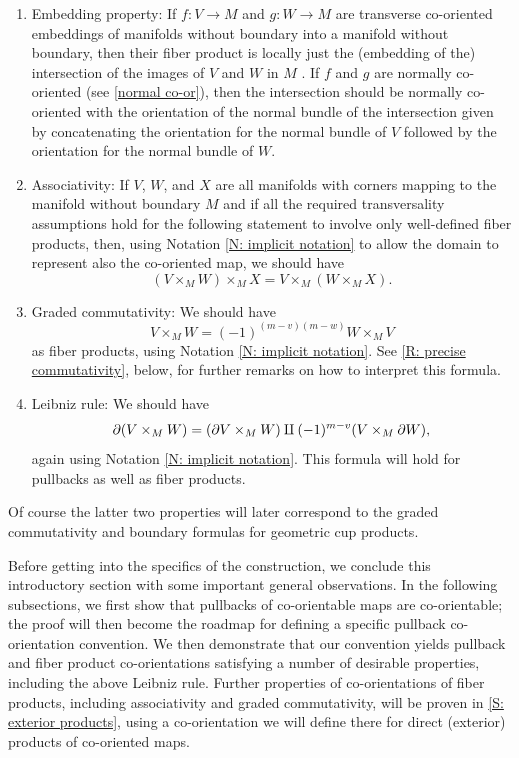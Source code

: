 \begin{enumerate}
	\item Embedding property: If $f \colon V \to M$ and $g \colon W \to M$ are transverse co-oriented embeddings of manifolds without boundary into a manifold without boundary, then their fiber product is locally just the (embedding of the) intersection of the images of $V$ and $W$ in $M$ \cite[Proposition 7.3.5]{MaDo92}.
	If $f$ and $g$ are normally co-oriented (see \cref{normal co-or}), then the intersection should be normally co-oriented with the orientation of the normal bundle of the intersection given by concatenating the orientation for the normal bundle of $V$ followed by the orientation for the normal bundle of $W$.

	\item Associativity: If $V$, $W$, and $X$ are all manifolds with corners mapping to the manifold without boundary $M$ and if all the required transversality assumptions hold for the following statement to involve only well-defined fiber products, then, using Notation \ref{N: implicit notation} to allow the domain to represent also the co-oriented map, we should have
	$$(V \times_M W) \times_M X = V \times_M (W \times_M X).$$

	\item Graded commutativity: We should have
	$$V \times_M W = (-1)^{(m-v)(m-w)}W \times_M V$$
	as fiber products, using Notation \ref{N: implicit notation}.
	See \cref{R: precise commutativity}, below, for further remarks on how to interpret this formula.

	\item Leibniz rule: We should have
	$$\partial (V \times_M W) = (\partial V \times_M W)\amalg (-1)^{m-v}(V \times_M \partial W),$$
	again using Notation \ref{N: implicit notation}.
	This formula will hold for pullbacks as well as fiber products.
\end{enumerate}
Of course the latter two properties will later correspond to the graded commutativity and boundary formulas for geometric cup products.

Before getting into the specifics of the construction, we conclude this introductory section with some important general observations.
In the following subsections, we first show that pullbacks of co-orientable maps are co-orientable; the proof will then become the roadmap for defining a specific pullback co-orientation convention.
We then demonstrate that our convention yields pullback and fiber product co-orientations satisfying a number of desirable properties, including the above Leibniz rule.
Further properties of co-orientations of fiber products, including associativity and graded commutativity, will be proven in \cref{S: exterior products}, using a co-orientation we will define there for direct (exterior) products of co-oriented maps.

